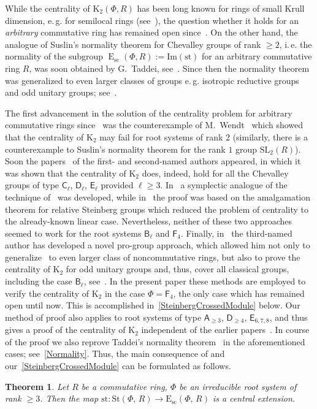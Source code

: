 \documentclass[oneside, 11pt]{amsart}
\numberwithin{equation}{section}
\newtheorem*{theorem*}{Theorem}
\theoremstyle{definition}
\theoremstyle{remark}
\DeclareMathOperator\E{E}
\newcommand{\rA}{\mathsf{A}}
\newcommand{\rB}{\mathsf{B}}
\newcommand{\rC}{\mathsf{C}}
\newcommand{\rD}{\mathsf{D}}
\newcommand{\rE}{\mathsf{E}}
\newcommand{\rF}{\mathsf{F}}
\begin{document}
While the centrality of $\mathrm K_2(\Phi, R)$ has been long known for rings of small Krull dimension, e.\,g. for semilocal rings (see~\cite{Ste73}), the question whether it holds for an {\it arbitrary} commutative ring has remained open since~\cite{vdK}.
On the other hand, the analogue of Suslin's normality theorem for Chevalley groups of rank $\geq 2$, i.\,e. the normality of the subgroup $\E_{\mathrm{sc}}(\Phi, R):= \mathrm{Im}(\mathrm{st})$ for an arbitrary commutative ring $R$, was soon obtained by G.~Taddei, see~\cite{Ta86}. Since then the normality theorem was generalized to even larger classes of groups e.\,g. isotropic reductive groups and odd unitary groups; see~\cite{Pe05,PS09,Ste16}.

The first advancement in the solution of the centrality problem for arbitrary commutative rings since~\cite{vdK} was the counterexample of M.~Wendt~\cite{Wendt} which showed that the centrality of $\mathrm K_2$ may fail for root systems of rank $2$ (similarly, there is a counterexample to Suslin's normality theorem for the rank $1$ group $\mathrm{SL}_2(R)$). Soon the papers~\cite{Lav,Sin,LavSin} of the first- and second-named authors appeared, in which it was shown that the centrality of $\mathrm K_2$ does, indeed, hold for all the Chevalley groups of type $\rC_\ell$, $\rD_\ell$, $\rE_\ell$ provided $\ell\geq 3$. In~\cite{Lav} a symplectic analogue of the technique of~\cite{vdK} was developed, while in~\cite{Sin, LavSin} the proof was based on the amalgamation theorem for relative Steinberg groups which reduced the problem of centrality to the already-known linear case. Nevertheless, neither of these two approaches seemed to work for the root systems $\rB_\ell$ and $\rF_4$. Finally, in~\cite{Vor1} the third-named author has developed a novel pro-group approach, which allowed him not only to generalize~\cite{vdK,Tul} to even larger class of noncommutative rings, but also to prove the centrality of $\mathrm K_2$ for odd unitary groups and, thus, cover all classical groups, including the case $\rB_\ell$, see~\cite{Vor2}. In the present paper these methods are employed to verify the centrality of $\mathrm K_2$ in the case $\Phi = \rF_4$, the only case which has remained open until now.
This is accomplished in~\cref{SteinbergCrossedModule} below. Our method of proof also applies to root systems of type $\rA_{\geq 3}$, $\rD_{\geq 4}$, $\rE_{6,7,8}$, and thus gives a proof of the centrality of $\mathrm{K}_2$ independent of the earlier papers~\cite{vdK,Sin,LavSin}. In course of the proof we also reprove Taddei's normality theorem~\cite{Ta86} in the aforementioned cases; see~\cref{Normality}. Thus, the main consequence of \cite{Vor2} and our~\cref{SteinbergCrossedModule} can be formulated as follows.
\begin{theorem*}
Let $R$ be a commutative ring, $\Phi$ be an irreducible root system of rank $\geq 3$. 
Then the map $\mathrm{st}\colon\mathrm{St}(\Phi,\,R) \to \mathrm{E}_{\mathrm{sc}}(\Phi,\,R)$ is a central extension.
\end{theorem*}
\end{document}
